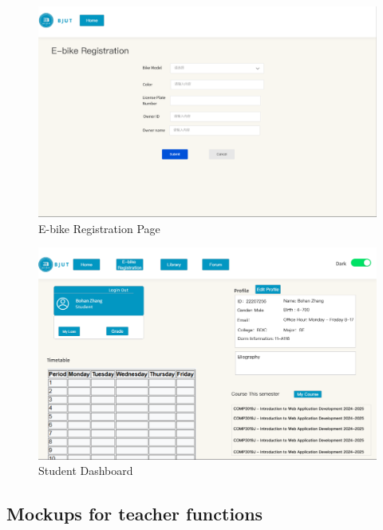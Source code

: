 \documentclass[12pt]{article}
\begin{document}
\begin{figure}[H]
    \centering
    \includegraphics[width=\textwidth]{mockups/student/registerebike.png}
    \caption{E-bike Registration Page}
    \label{fig:registerebike_page}
\end{figure}

\begin{figure}[H]
    \centering
    \includegraphics[width=\textwidth]{mockups/student/studentdash.png}
    \caption{Student Dashboard}
    \label{fig:student_dashboard}
\end{figure}


\subsection{Mockups for teacher functions}
\end{document}
